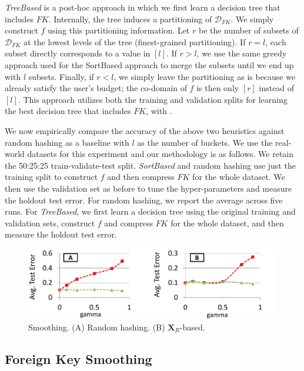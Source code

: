 \documentclass[sigconf]{acmart}
\begin{document}
{\textit{TreeBased} is a post-hoc approach in which we first learn a decision tree that includes $FK$. Internally, the tree induces a partitioning of 
$\mathcal{D}_{FK}$. We simply construct $f$ using this partitioning information. Let $r$ be the number of subsets of $\mathcal{D}_{FK}$ at the lowest levels of the tree 
(finest-grained partitioning). If $r = l$, each subset directly corresponds to a value in $[l]$. If $r > l$, we use the same greedy approach used for the SortBased 
approach to merge the subsets until we end up with $l$ subsets. Finally, if $r < l$, we simply leave the partitioning as is because we already satisfy the user's budget;
the co-domain of $f$ is then only $[r]$ instead of $[l]$. This approach utilizes both the training and validation splits for learning the best decision tree that includes $FK$, with .

We now empirically compare the accuracy of the above two heuristics against random hashing as a baseline with $l$ as the number of buckets. 
We use the real-world datasets for this experiment and our methodology is as follows. We retain the 50:25:25 train-validate-test split.
\textit{SortBased} and random hashing use just the training split to construct $f$ and then compress $FK$ for the whole dataset. We then use
the validation set as before to tune the hyper-parameters and measure the holdout test error. For random hashing, we report the average across 
five runs. For \textit{TreeBased}, we first learn a decision tree using the original training and validation sets, construct $f$ and compress 
$FK$ for the whole dataset, and then measure the holdout test error.
}


\begin{figure}
\centering
\includegraphics[width=0.99\linewidth]{smoothing.pdf}
\vspace{-4mm}
\caption{Smoothing. (A) Random hashing. (B) $\textbf{X}_R$-based.}
\label{Figure:smoothing}
\vspace{-2mm}
\end{figure}

\subsection{Foreign Key Smoothing}
\end{document}

